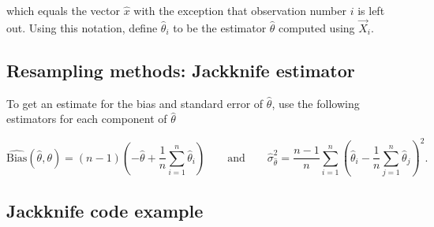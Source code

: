\documentclass[%
oneside,                 %
final,                   %
10pt]{article}
\begin{document}
which equals the vector $\hat{x}$ with the exception that observation
number $i$ is left out. Using this notation, define
$\widehat{\theta}_i$ to be the estimator
$\widehat{\theta}$ computed using $\vec{X}_i$. 

\subsection*{Resampling methods: Jackknife estimator}

To get an estimate for the bias and
standard error of $\widehat{\theta}$, use the following
estimators for each component of $\widehat{\theta}$

\[
\widehat{\mathrm{Bias}}(\widehat \theta,\theta) = (n-1)\left( - \widehat{\theta} + \frac{1}{n}\sum_{i=1}^{n} \widehat \theta_i \right) \qquad \text{and} \qquad \widehat{\sigma}^2_{\widehat{\theta} } = \frac{n-1}{n}\sum_{i=1}^{n}( \widehat{\theta}_i - \frac{1}{n}\sum_{j=1}^{n}\widehat \theta_j )^2.
\]

\subsection*{Jackknife code example}
\end{document}
